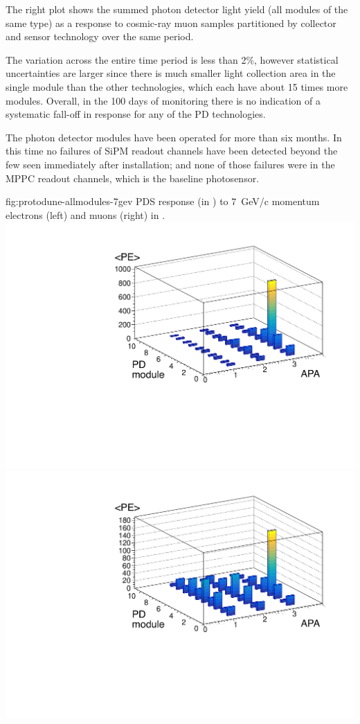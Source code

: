\begin{itemize}
    The right plot shows the summed photon detector light yield (all modules of the same type) as a response to cosmic-ray muon samples partitioned by collector and sensor technology over the same period. 
    
  
    The  variation across the entire time period is less than 2\%, however statistical uncertainties are larger since there is much smaller light collection area in the single  module than the other technologies, which each have about 15 times more modules. Overall, in the 100 days of monitoring there is no indication of a systematic fall-off in response for any of the PD technologies. 

\end{itemize}

The  photon detector modules have been operated for more than six months.  In this time no failures of SiPM readout channels have been detected beyond the few seen immediately after installation;  and none of those failures were in the MPPC readout channels, which is the baseline photosensor. 

\begin{dunefigure}{fig:protodune-allmodules-7gev}
{PDS response (in \phel) to \SI{7}{GeV/c} momentum electrons (left) and muons (right) in .}
\includegraphics[angle=0,width=0.48\columnwidth]{graphics/pds-electrons-pd-modules.pdf}
\includegraphics[angle=0,width=0.48\columnwidth]{graphics/pds-muons-pd-modules.pdf}
\end{dunefigure}

